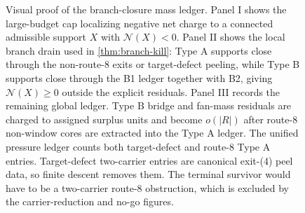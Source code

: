 \documentclass[11pt]{article}
\newcommand{\No}{\mathcal N}
\begin{document}
\begin{figure}[t]
{%
}
\caption[Visual proof of the branch-closure mass ledger]{Visual proof of the branch-closure mass ledger.  Panel I shows the large-budget cap localizing negative net charge to a connected admissible support \(X\) with \(\No(X)<0\).  Panel II shows the local branch drain used in \cref{thm:branch-kill}: Type A supports close through the non-route-8 exits or target-defect peeling, while Type B supports close through the B1 ledger together with B2, giving \(\No(X)\ge0\) outside the explicit residuals.  Panel III records the remaining global ledger.  Type B bridge and fan-mass residuals are charged to assigned surplus units and become \(o(|R|)\) after route-8 non-window cores are extracted into the Type A ledger.  The unified pressure ledger counts both target-defect and route-8 Type A entries.  Target-defect two-carrier entries are canonical exit-\textup{(4)} peel data, so finite descent removes them.  The terminal survivor would have to be a two-carrier route-8 obstruction, which is excluded by the carrier-reduction and no-go figures.}
\label{fig:branch-closure-mass-ledger}
\end{figure}
\end{document}
